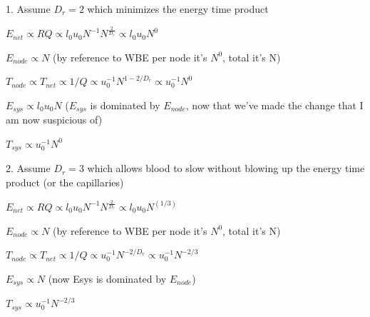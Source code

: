 \documentclass[12pt]{article}
\begin{document}
1. Assume $D_r = 2$ which minimizes the energy time product

$E_{net} \propto RQ \propto l_0 u_0 N^{-1}  N^{\frac{2}{D_r}} \propto l_0 u_0 N^0$ 



$E_{node} \propto N$ (by reference to WBE per node it's $N^0$, total it's N)

$T_{node} \propto T_{net} \propto 1/Q \propto u_0^{-1} N^{1-2/D_r}\propto u_0^{-1} N^0$ 

$E_{sys} \propto l_0 u_0 N$  ($E_{sys}$ is dominated by $E_{node}$, now that we've made the change that I am now suspicious of)

$T_{sys} \propto u_0^{-1} N^0$






2. Assume $D_r = 3$ which allows blood to slow without blowing up the energy time product (or the capillaries)


$E_{net} \propto RQ \propto l_0 u_0 N^{-1}  N^{\frac{2}{D_r}} \propto l_0 u_0 N^{(1/3)}$ 

$E_{node} \propto N$ (by reference to WBE per node it's $N^0$, total it's N)

$T_{node} \propto T_{net} \propto 1/Q \propto u_0^{-1} N^{-2/D_r}\propto u_0^{-1} N^{-2/3}$ 

$E_{sys} \propto N$  (now Esys is dominated by $E_{node}$)%

$T_{sys} \propto u_0^{-1} N^{-2/3}$



%
%
%
%
%
\end{document}
